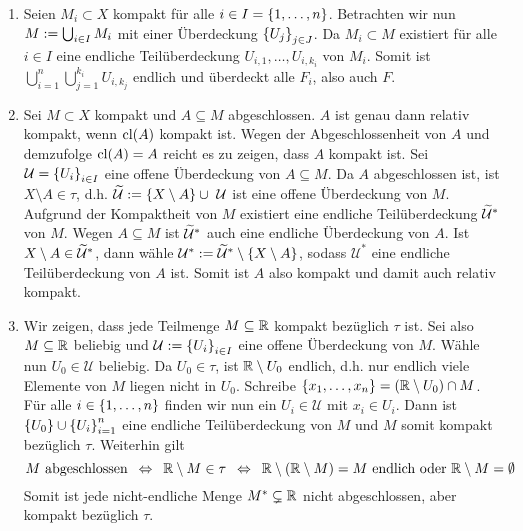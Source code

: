 \begin{exercisePage}
	\begin{enumerate}[leftmargin=\zulength, label=(zu \alph*)]
		\item Seien $M_i \subset X$ kompakt für alle $i \in I = \left\{ 1,\dots,n \right\}$. Betrachten wir nun $M \mathrel{:=} \bigcup_{i \in I} M_i$ mit einer Überdeckung $\left\{ U_j \right\}_{j \in J}$. Da $M_i \subset M$ existiert für alle $i \in I$ eine endliche Teilüberdeckung $U_{i,1}, \dots, U_{i,k_i}$ von $M_i$. Somit ist $\bigcup_{i = 1}^n \bigcup_{j=1}^{k_i} U_{i,k_j}$ endlich und überdeckt alle $F_i$, also auch $F$.
		\item Sei $M \subset X$ kompakt und $A \subseteq M$ abgeschlossen. $A$ ist genau dann relativ kompakt, wenn $\operatorname{cl}(A)$ kompakt ist. Wegen der Abgeschlossenheit von $A$ und demzufolge $\operatorname{cl}(A) = A$ reicht es zu zeigen, dass $A$ kompakt ist.
		Sei $\mathcal{U} = \left\{ U_i \right\}_{i \in I}$ eine offene Überdeckung von $A \subseteq M$. Da $A$ abgeschlossen ist, ist $X \setminus A \in \tau$, d.h. $\widetilde{\mathcal{U}} \mathrel{:=} \left\{ X \setminus A \right\} \cup \ \mathcal{U}$ ist eine offene Überdeckung von $M$. Aufgrund der Kompaktheit von $M$ existiert eine endliche Teilüberdeckung $\widetilde{\mathcal{U}}^\ast$ von $M$. Wegen $A \subseteq M$ ist $\widetilde{\mathcal{U}}^\ast$ auch eine endliche Überdeckung von $A$. Ist $X \setminus A \in \widetilde{\mathcal{U}}^\ast$, dann wähle $\mathcal{U}^\ast \mathrel{:=} \widetilde{\mathcal{U}}^\ast \setminus \left\{ X \setminus A \right\}$, sodass $\mathcal{U}^\ast$ eine endliche Teilüberdeckung von $A$ ist. Somit ist $A$ also kompakt und damit auch relativ kompakt.
		\item Wir zeigen, dass jede Teilmenge $M \subseteq \mathbb{R}$ kompakt bezüglich $\tau$ ist. 
		Sei also $M \subseteq \mathbb{R}$ beliebig und $\mathcal{U} \mathrel{:=} \left\{ U_i \right\}_{i \in I}$ eine offene Überdeckung von $M$. Wähle nun $U_0 \in \mathcal{U}$ beliebig. Da $U_0 \in \tau$, ist $\mathbb{R} \setminus U_0$ endlich, d.h. nur endlich viele Elemente von $M$ liegen nicht in $U_0$. Schreibe $\left\{ x_1, \dots, x_n \right\} = \left( \mathbb{R} \setminus U_0 \right) \cap M$. Für alle $i \in \left\{ 1, \dots, n \right\}$ finden wir nun ein $U_i \in \mathcal{U}$ mit $x_i \in U_i$. Dann ist $\left\{ U_0 \right\} \cup \left\{ U_i \right\}_{i=1}^n$ eine endliche Teilüberdeckung von $M$ und $M$ somit kompakt bezüglich $\tau$.		
		Weiterhin gilt
		\begin{equation*}
			M \text{ abgeschlossen} \enskip \Leftrightarrow \enskip \mathbb{R} \setminus M \in \tau \enskip \Leftrightarrow \enskip \mathbb{R} \setminus \left( \mathbb{R} \setminus M \right) = M \text{ endlich oder } \mathbb{R} \setminus M = \emptyset
		\end{equation*}
		Somit ist jede nicht-endliche Menge $M^\ast \subsetneq \mathbb{R}$ nicht abgeschlossen, aber kompakt bezüglich $\tau$.
	\end{enumerate}


\end{exercisePage}
